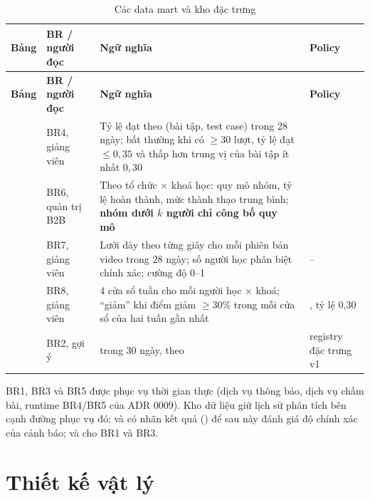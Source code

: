 {\small
\begin{longtable}{@{}L{3.6cm}L{2.0cm}L{6.0cm}L{2.9cm}@{}}
\caption{Các data mart và kho đặc trưng}\label{tab:marts}\\
\toprule
\textbf{Bảng} & \textbf{BR / người đọc} & \textbf{Ngữ nghĩa} & \textbf{Policy} \\
\midrule
\endfirsthead
\toprule
\textbf{Bảng} & \textbf{BR / người đọc} & \textbf{Ngữ nghĩa} & \textbf{Policy} \\
\midrule
\endhead
{} & BR4, giảng viên & Tỷ lệ đạt theo (bài tập, test case) trong 28 ngày; bất thường khi có $\ge 30$ lượt, tỷ lệ đạt $\le 0{,}35$ và thấp hơn trung vị của bài tập ít nhất $0{,}30$ &  \\
 & BR6, quản trị B2B & Theo tổ chức × khoá học: quy mô nhóm, tỷ lệ hoàn thành, mức thành thạo trung bình; \textbf{nhóm dưới $k$ người chỉ công bố quy mô}~\cite{sweeney2002} &  \\
 & BR7, giảng viên & Lưới dày theo từng giây cho mỗi phiên bản video trong 28 ngày; số người học phân biệt chính xác; cường độ 0--1 & -- \\
 & BR8, giảng viên & 4 cửa sổ tuần cho mỗi người học × khoá; ``giảm'' khi điểm giảm $\ge 30\%$ trong mỗi cửa sổ của hai tuần gần nhất & , tỷ lệ 0,30 \\
 & BR2, gợi ý &  trong 30 ngày, theo  & registry đặc trưng v1 \\
\bottomrule
\end{longtable}}

BR1, BR3 và BR5 được phục vụ thời gian thực (dịch vụ thông báo, dịch vụ chấm bài, runtime BR4/BR5 của ADR 0009). Kho dữ liệu giữ lịch sử phân tích bên cạnh đường phục vụ đó:  và  có nhãn kết quả () để sau này đánh giá độ chính xác của cảnh báo;  và  cho BR1 và BR3.

\section{Thiết kế vật lý}

